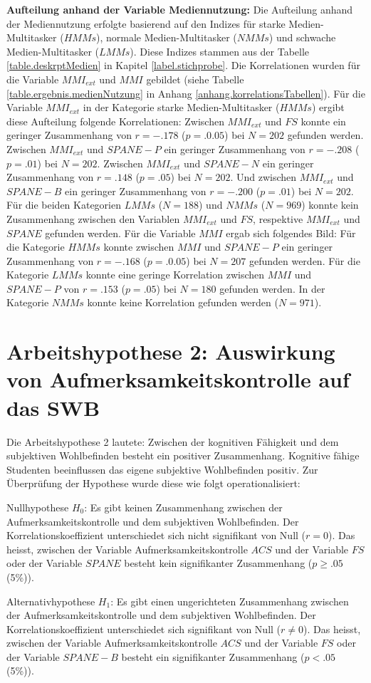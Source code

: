 \textbf{Aufteilung anhand der Variable Mediennutzung:} Die Aufteilung anhand der Mediennutzung erfolgte basierend auf den Indizes für starke Medien-Multitasker ($HMMs$), normale Medien-Multitasker ($NMMs$) und schwache Medien-Multitasker ($LMMs$). Diese Indizes stammen aus der Tabelle \ref{table.deskrptMedien} in Kapitel \ref{label.stichprobe}. Die Korrelationen wurden für die Variable $MMI_{ext}$ und $MMI$ gebildet (siehe Tabelle \ref{table.ergebnis.medienNutzung} in Anhang \ref{anhang.korrelationsTabellen}). Für die Variable $MMI_{ext}$ in der Kategorie starke Medien-Multitasker ($HMMs$) ergibt diese Aufteilung folgende Korrelationen: Zwischen $MMI_{ext}$ und $FS$ konnte ein geringer Zusammenhang von $r=-.178$ ($p=.0.05$) bei $N=202$ gefunden werden. Zwischen $MMI_{ext}$ und $SPANE-P$ ein geringer Zusammenhang von $r=-.208$ ($p=.01$) bei $N=202$. Zwischen $MMI_{ext}$ und $SPANE-N$ ein geringer Zusammenhang von $r=.148$ ($p=.05$) bei $N=202$. Und zwischen $MMI_{ext}$ und $SPANE-B$ ein geringer Zusammenhang von $r=-.200$ ($p=.01$) bei $N=202$. Für die beiden Kategorien $LMMs$ ($N=188$) und $NMMs$ ($N=969$) konnte kein Zusammenhang zwischen den Variablen $MMI_{ext}$ und $FS$, respektive $MMI_{ext}$ und $SPANE$ gefunden werden. Für die Variable $MMI$ ergab sich folgendes Bild: Für die Kategorie $HMMs$ konnte zwischen $MMI$ und $SPANE-P$ ein geringer Zusammenhang von $r=-. 168$ ($p=.0.05$) bei $N=207$ gefunden werden. Für die Kategorie $LMMs$ konnte eine geringe Korrelation zwischen $MMI$ und $SPANE-P$ von $r=.153$ ($p=.05$) bei $N=180$ gefunden werden. In der Kategorie $NMMs$ konnte keine Korrelation gefunden werden ($N=971$).

\section{Arbeitshypothese 2: Auswirkung von Aufmerksamkeitskontrolle auf das SWB}\label{label.ergebnisse.arbeitshypothese2}
Die Arbeitshypothese 2 lautete: Zwischen der kognitiven Fähigkeit  und dem subjektiven Wohlbefinden besteht ein positiver Zusammenhang. Kognitive fähige Studenten beeinflussen das eigene subjektive Wohlbefinden positiv. Zur Überprüfung der Hypothese wurde diese wie folgt operationalisiert:
\par
Nullhypothese $H_{0}$: Es gibt keinen Zusammenhang zwischen der Aufmerksamkeitskontrolle und dem subjektiven Wohlbefinden. Der Korrelationskoeffizient unterschiedet sich nicht signifikant von Null ($r=0$). Das heisst, zwischen der Variable Aufmerksamkeitskontrolle $ACS$ und der Variable $FS$ oder der Variable $SPANE$ besteht kein signifikanter Zusammenhang ($p \geq .05$ (5\%)).
\par
Alternativhypothese $H_{1}$: Es gibt einen ungerichteten Zusammenhang zwischen der Aufmerksamkeitskontrolle und dem subjektiven Wohlbefinden. Der Korrelationskoeffizient unterschiedet sich signifikant von Null ($r \neq 0$). Das heisst, zwischen der Variable Aufmerksamkeitskontrolle $ACS$ und der Variable $FS$ oder der Variable $SPANE-B$ besteht ein signifikanter Zusammenhang ($p < .05$ (5\%)).

